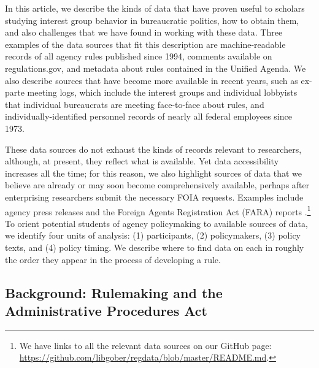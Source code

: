 \documentclass[
      12pt,
        ]{article}
\begin{document}
In this article, we describe the kinds of data that have proven useful
to scholars studying interest group behavior in bureaucratic politics,
how to obtain them, and also challenges that we have found in working
with these data. Three examples of the data sources that fit this
description are machine-readable records of all agency rules published
since 1994, comments available on regulations.gov, and metadata about
rules contained in the Unified Agenda. We also describe sources that
have become more available in recent years, such as ex-parte meeting
logs, which include the interest groups and individual lobbyists that
individual bureaucrats are meeting face-to-face about rules, and
individually-identified personnel records of nearly all federal
employees since 1973.

These data sources do not exhaust the kinds of records relevant to
researchers, although, at present, they reflect what is available. Yet
data accessibility increases all the time; for this reason, we also
highlight sources of data that we believe are already or may soon become
comprehensively available, perhaps after enterprising researchers submit
the necessary FOIA requests. Examples include agency press releases
\citep[see, e.g.,][\citet{Libgober2018}]{LibgoberJOP} and the Foreign
Agents Registration Act (FARA) reports
\citep{ShepherdAPSR2019}.\footnote{We have links to all the relevant
  data sources on our GitHub page:
  \url{https://github.com/libgober/regdata/blob/master/README.md}.} To
orient potential students of agency policymaking to available sources of
data, we identify four units of analysis: (1) participants, (2)
policymakers, (3) policy texts, and (4) policy timing. We describe where
to find data on each in roughly the order they appear in the process of
developing a rule.

\hypertarget{background-rulemaking-and-the-administrative-procedures-act}{%
\subsection*{Background: Rulemaking and the Administrative Procedures
Act}\label{background-rulemaking-and-the-administrative-procedures-act}}
\end{document}
